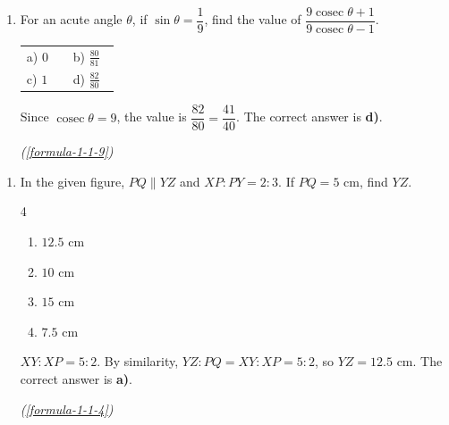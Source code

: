 \vspace{1.2em}
\begin{enumerate}[label={},leftmargin=1.15cm,labelwidth=1.0cm,labelsep=0.15cm,itemindent=0pt,listparindent=0pt,parsep=0pt,topsep=0pt]
\item[5.1.14] For an acute angle $\theta$, if $\sin\theta=\dfrac{1}{9}$, find the value of $\dfrac{9\operatorname{cosec}\theta+1}{9\operatorname{cosec}\theta-1}$.

\begin{tabular}{@{}p{0.42\linewidth}p{0.42\linewidth}@{}}
a) $0$ & b) $\frac{80}{81}$\\
c) $1$ & d) $\frac{82}{80}$
\end{tabular}

\vspace{0.7em}\par\solution
 Since $\operatorname{cosec}\theta=9$, the value is $\dfrac{82}{80}=\dfrac{41}{40}$. The correct answer is \textbf{d)}.
\par\noindent\hfill\mbox{\textit{(\ref{formula-1-1-9})}}\par\end{enumerate}
\vspace{1.2em}
\begin{enumerate}[label={},leftmargin=1.15cm,labelwidth=1.0cm,labelsep=0.15cm,itemindent=0pt,listparindent=0pt,parsep=0pt,topsep=0pt]
\item[5.1.15] In the given figure, $PQ\parallel YZ$ and $XP:PY=2:3$. If $PQ=5$ cm, find $YZ$.
\par\nopagebreak[4]

\begin{multicols}{4}
\begin{enumerate}
\setlength{\itemsep}{0pt}
    \item $12.5$ cm
    \item $10$ cm
    \item $15$ cm
    \item $7.5$ cm
\end{enumerate}
\end{multicols}

\vspace{0.7em}\par\solution
 $XY:XP=5:2$. By similarity, $YZ:PQ=XY:XP=5:2$, so $YZ=12.5$ cm. The correct answer is \textbf{a)}.
\par\noindent\hfill\mbox{\textit{(\ref{formula-1-1-4})}}\par\end{enumerate}
\vspace{1.2em}
